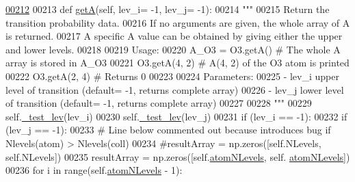 \begin{DoxyCode}
\hypertarget{classpyneb_1_1core_1_1pynebcore_1_1___atom_data_fits_l00212}{}\hyperlink{classpyneb_1_1core_1_1pynebcore_1_1___atom_data_fits_a4ecca5287d3b6bf0d6e44b9bb184db77}{00212} 
00213     \textcolor{keyword}{def }\hyperlink{classpyneb_1_1core_1_1pynebcore_1_1___atom_data_fits_a4ecca5287d3b6bf0d6e44b9bb184db77}{getA}(self, lev\_i= -1, lev\_j= -1):
00214         \textcolor{stringliteral}{"""}
00215 \textcolor{stringliteral}{        Return the transition probability data. }
00216 \textcolor{stringliteral}{        If no arguments are given, the whole array of A is returned.}
00217 \textcolor{stringliteral}{        A specific A value can be obtained by giving either the upper and lower levels.}
00218 \textcolor{stringliteral}{            }
00219 \textcolor{stringliteral}{        Usage:}
00220 \textcolor{stringliteral}{            A\_O3 = O3.getA()          # The whole A array is stored in A\_O3}
00221 \textcolor{stringliteral}{            O3.getA(4, 2)      # A(4, 2) of the O3 atom is printed}
00222 \textcolor{stringliteral}{            O3.getA(2, 4)      # Returns 0}
00223 \textcolor{stringliteral}{}
00224 \textcolor{stringliteral}{        Parameters:}
00225 \textcolor{stringliteral}{            - lev\_i  upper level of transition (default= -1, returns complete array)}
00226 \textcolor{stringliteral}{            - lev\_j  lower level of transition (default= -1, returns complete array)}
00227 \textcolor{stringliteral}{            }
00228 \textcolor{stringliteral}{        """}
00229         self.\hyperlink{classpyneb_1_1core_1_1pynebcore_1_1___atom_data_fits_a8e68300d05a33ee0bd949cbc5820e34c}{\_test\_lev}(lev\_i)
00230         self.\hyperlink{classpyneb_1_1core_1_1pynebcore_1_1___atom_data_fits_a8e68300d05a33ee0bd949cbc5820e34c}{\_test\_lev}(lev\_j)
00231         \textcolor{keywordflow}{if} (lev\_i == -1):
00232             \textcolor{keywordflow}{if} (lev\_j == -1):
00233                 \textcolor{comment}{# Line below commented out because introduces bug if Nlevels(atom) > Nlevels(coll)}
00234                 \textcolor{comment}{#resultArray = np.zeros([self.NLevels, self.NLevels])}
00235                 resultArray = np.zeros([self.\hyperlink{classpyneb_1_1core_1_1pynebcore_1_1___atom_data_fits_a4ff73bfa251e1139692c2a60f9821315}{atomNLevels}, self.
      \hyperlink{classpyneb_1_1core_1_1pynebcore_1_1___atom_data_fits_a4ff73bfa251e1139692c2a60f9821315}{atomNLevels}])
00236                 \textcolor{keywordflow}{for} i \textcolor{keywordflow}{in} range(self.\hyperlink{classpyneb_1_1core_1_1pynebcore_1_1___atom_data_fits_a4ff73bfa251e1139692c2a60f9821315}{atomNLevels} - 1):

\end{DoxyCode}
